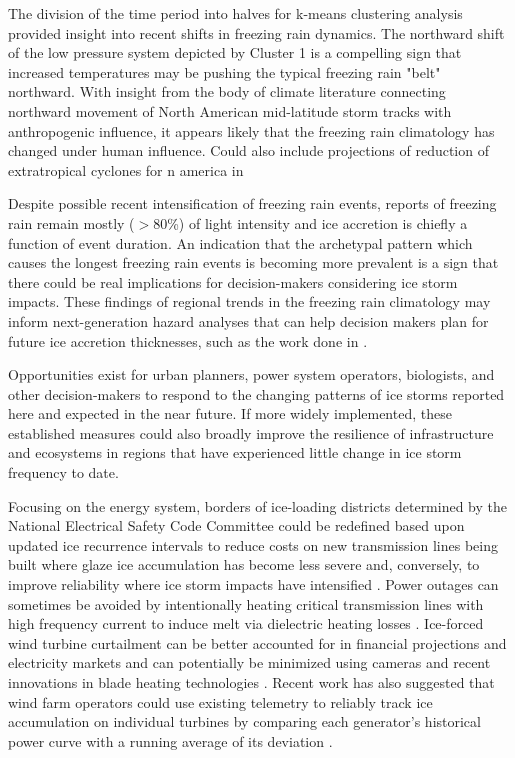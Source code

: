 \documentclass[twocol]{ametsoc}
\begin{document}
The division of the time period into halves for k-means clustering analysis provided insight into recent shifts in freezing rain dynamics. The northward shift of the low pressure system depicted by Cluster 1 is a compelling sign that increased temperatures may be pushing the typical freezing rain "belt" northward. With insight from the body of climate literature connecting northward movement of North American mid-latitude storm tracks with anthropogenic influence, it appears likely that the freezing rain climatology has changed under human influence.  Could also include projections of reduction of extratropical cyclones for n america in \citet{chang2013cmip5}

Despite possible recent intensification of freezing rain events, reports of freezing rain remain mostly ($>$80\%) of light intensity and ice accretion is chiefly a function of event duration. An indication that the archetypal pattern which causes the longest freezing rain events is becoming more prevalent is a sign that there could be real implications for decision-makers considering ice storm impacts. These findings of regional trends in the freezing rain climatology may inform next-generation hazard analyses that can help decision makers plan for future ice accretion thicknesses, such as the work done in \citet{erfani2014aggregated}.

Opportunities exist for urban planners, power system operators, biologists, and other decision-makers to respond to the changing patterns of ice storms reported here and expected in the near future. If more widely implemented, these established measures could also broadly improve the resilience of infrastructure and ecosystems in regions that have experienced little change in ice storm frequency to date. 

Focusing on the energy system, borders of ice-loading districts determined by the National Electrical Safety Code Committee could be redefined based upon updated ice recurrence intervals to reduce costs on new transmission lines being built where glaze ice accumulation has become less severe and, conversely, to improve reliability where ice storm impacts have intensified \citep{american2013minimum}. Power outages can sometimes be avoided by intentionally heating critical transmission lines with high frequency current to induce melt via dielectric heating losses \citep{bendel1981review,huneault2005combined,mccurdy2001using}. Ice-forced wind turbine curtailment can be better accounted for in financial projections and electricity markets and can potentially be minimized using cameras and recent innovations in blade heating technologies \citep{bird2014wind}. Recent work has also suggested that wind farm operators could use existing telemetry to reliably track ice accumulation on individual turbines by comparing each generator's historical power curve with a running average of its deviation \citep{davis2016ice}.
\end{document}
